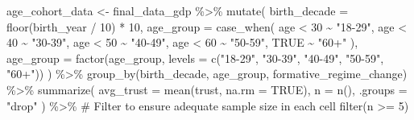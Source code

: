 \documentclass[
  letterpaper,
  DIV=11,
  numbers=noendperiod]{scrartcl}
\newenvironment{Shaded}{\begin{snugshade}}{\end{snugshade}}
\newcommand{\AttributeTok}[1]{\textcolor[rgb]{0.40,0.45,0.13}{#1}}
\newcommand{\CommentTok}[1]{\textcolor[rgb]{0.37,0.37,0.37}{#1}}
\newcommand{\ConstantTok}[1]{\textcolor[rgb]{0.56,0.35,0.01}{#1}}
\newcommand{\DecValTok}[1]{\textcolor[rgb]{0.68,0.00,0.00}{#1}}
\newcommand{\FunctionTok}[1]{\textcolor[rgb]{0.28,0.35,0.67}{#1}}
\newcommand{\NormalTok}[1]{\textcolor[rgb]{0.00,0.23,0.31}{#1}}
\newcommand{\OtherTok}[1]{\textcolor[rgb]{0.00,0.23,0.31}{#1}}
\newcommand{\SpecialCharTok}[1]{\textcolor[rgb]{0.37,0.37,0.37}{#1}}
\newcommand{\StringTok}[1]{\textcolor[rgb]{0.13,0.47,0.30}{#1}}
\begin{document}
\begin{Shaded}
\begin{Highlighting}[]
\NormalTok{age\_cohort\_data }\OtherTok{\textless{}{-}}\NormalTok{ final\_data\_gdp }\SpecialCharTok{\%\textgreater{}\%}
  \FunctionTok{mutate}\NormalTok{(}
    \AttributeTok{birth\_decade =} \FunctionTok{floor}\NormalTok{(birth\_year }\SpecialCharTok{/} \DecValTok{10}\NormalTok{) }\SpecialCharTok{*} \DecValTok{10}\NormalTok{,}
    \AttributeTok{age\_group =} \FunctionTok{case\_when}\NormalTok{(}
\NormalTok{      age }\SpecialCharTok{\textless{}} \DecValTok{30} \SpecialCharTok{\textasciitilde{}} \StringTok{"18{-}29"}\NormalTok{,}
\NormalTok{      age }\SpecialCharTok{\textless{}} \DecValTok{40} \SpecialCharTok{\textasciitilde{}} \StringTok{"30{-}39"}\NormalTok{,}
\NormalTok{      age }\SpecialCharTok{\textless{}} \DecValTok{50} \SpecialCharTok{\textasciitilde{}} \StringTok{"40{-}49"}\NormalTok{,}
\NormalTok{      age }\SpecialCharTok{\textless{}} \DecValTok{60} \SpecialCharTok{\textasciitilde{}} \StringTok{"50{-}59"}\NormalTok{,}
      \ConstantTok{TRUE} \SpecialCharTok{\textasciitilde{}} \StringTok{"60+"}
\NormalTok{    ),}
    \AttributeTok{age\_group =} \FunctionTok{factor}\NormalTok{(age\_group, }\AttributeTok{levels =} \FunctionTok{c}\NormalTok{(}\StringTok{"18{-}29"}\NormalTok{, }\StringTok{"30{-}39"}\NormalTok{, }\StringTok{"40{-}49"}\NormalTok{, }\StringTok{"50{-}59"}\NormalTok{, }\StringTok{"60+"}\NormalTok{))}
\NormalTok{  ) }\SpecialCharTok{\%\textgreater{}\%}
  \FunctionTok{group\_by}\NormalTok{(birth\_decade, age\_group, formative\_regime\_change) }\SpecialCharTok{\%\textgreater{}\%}
  \FunctionTok{summarize}\NormalTok{(}
    \AttributeTok{avg\_trust =} \FunctionTok{mean}\NormalTok{(trust, }\AttributeTok{na.rm =} \ConstantTok{TRUE}\NormalTok{),}
    \AttributeTok{n =} \FunctionTok{n}\NormalTok{(),}
    \AttributeTok{.groups =} \StringTok{"drop"}
\NormalTok{  ) }\SpecialCharTok{\%\textgreater{}\%}
  \CommentTok{\# Filter to ensure adequate sample size in each cell}
  \FunctionTok{filter}\NormalTok{(n }\SpecialCharTok{\textgreater{}=} \DecValTok{5}\NormalTok{)}


\end{Highlighting}
\end{Shaded}
\end{document}
